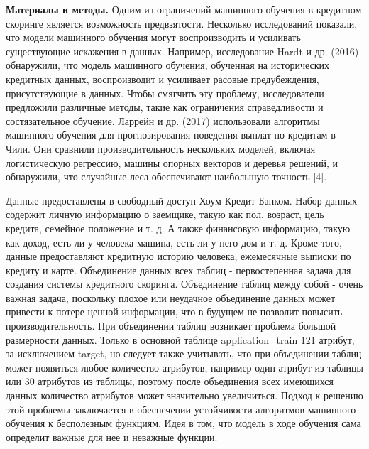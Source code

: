 {\bfseries Материалы и методы.} Одним из ограничений машинного обучения в
кредитном скоринге является возможность предвзятости. Несколько
исследований показали, что модели машинного обучения могут
воспроизводить и усиливать существующие искажения в данных. Например,
исследование Hardt и др. (2016) обнаружили, что модель машинного
обучения, обученная на исторических кредитных данных, воспроизводит и
усиливает расовые предубеждения, присутствующие в данных. Чтобы смягчить
эту проблему, исследователи предложили различные методы, такие как
ограничения справедливости и состязательное обучение. Ларрейн и др.
(2017) использовали алгоритмы машинного обучения для прогнозирования
поведения выплат по кредитам в Чили. Они сравнили производительность
нескольких моделей, включая логистическую регрессию, машины опорных
векторов и деревья решений, и обнаружили, что случайные леса
обеспечивают наибольшую точность {[}4{]}.

Данные предоставлены в свободный доступ Хоум Кредит Банком. Набор данных
содержит личную информацию о заемщике, такую \hspace{0pt}\hspace{0pt}как
пол, возраст, цель кредита, семейное положение и т. д. А также
финансовую информацию, такую
\hspace{0pt}\hspace{0pt}\hspace{0pt}\hspace{0pt}как доход, есть ли у
человека машина, есть ли у него дом и т. д. Кроме того, данные
предоставляют кредитную историю человека, ежемесячные выписки по кредиту
и карте. Объединение данных всех таблиц - первостепенная задача для
создания системы кредитного скоринга. Объединение таблиц между собой -
очень важная задача, поскольку плохое или неудачное объединение данных
может привести к потере ценной информации, что в будущем не позволит
повысить производительность. При объединении таблиц возникает проблема
большой размерности данных. Только в основной таблице application\_train
121 атрибут, за исключением target, но следует также учитывать, что при
объединении таблиц может появиться любое количество атрибутов, например
один атрибут из таблицы или 30 атрибутов из таблицы, поэтому после
объединения всех имеющихся данных количество атрибутов может значительно
увеличиться. Подход к решению этой проблемы заключается в обеспечении
устойчивости алгоритмов машинного обучения к бесполезным функциям. Идея
в том, что модель в ходе обучения сама определит важные для нее и
неважные функции.

